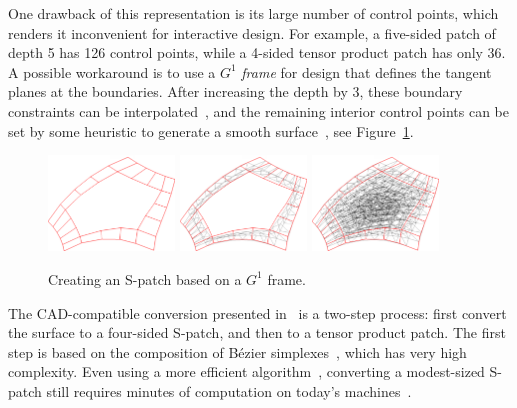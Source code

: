 \documentclass{article}
\begin{document}
One drawback of this representation is its large number of control points, which renders it
inconvenient for interactive design. For example, a five-sided patch of depth 5 has 126 control
points, while a 4-sided tensor product patch has only 36. A possible workaround is to use a
$G^1$ \emph{frame} for design that defines the tangent planes at the boundaries.
After increasing the depth by 3, these boundary constraints can be interpolated~\cite{spatch2},
and the remaining interior control points can be set by some heuristic to generate a smooth
surface~\cite{salvi-kepaf}, see Figure~\ref{fig:spatch}.
\begin{figure}
  \centering
  \includegraphics[width = 0.3\textwidth]{images/5-5-bezier-ribbon.png}
  \hfill
  \includegraphics[width = 0.3\textwidth]{images/5-5-cnet-ribbon.png}
  \hfill
  \includegraphics[width = 0.3\textwidth]{images/5-5-cnet-full.png}
  \caption{Creating an S-patch based on a $G^1$ frame.}
  \label{fig:spatch}
\end{figure}

The CAD-compatible conversion presented in~\cite{spatch1} is a two-step process:
first convert the surface to a
four-sided S-patch, and then to a tensor product patch. The first step is based on the
composition of B\'ezier simplexes~\cite{simplex1}, which has very high complexity.
Even using a more efficient algorithm~\cite{simplex2}, converting a modest-sized S-patch
still requires minutes of computation on today's machines~\cite{salvi-wait}.
\end{document}
